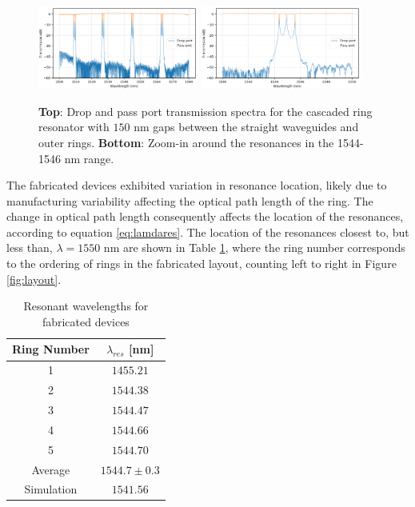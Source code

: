 \documentclass[letterpaper, 10 pt, conference]{ieeeconf}
\begin{document}
\begin{figure}[!ht]
    \centering
    \includegraphics[width = 0.47\textwidth]{casc_full.png}
    \includegraphics[width = 0.47\textwidth]{cascade_zoom.png}
    \caption{\textbf{Top}: Drop and pass port transmission spectra for the cascaded ring resonator with $150$ nm gaps between the straight waveguides and outer rings. \textbf{Bottom}: Zoom-in around the resonances in the 1544-1546 nm range. }
    \label{fig:casc_zoom}
\end{figure} 


The fabricated devices exhibited variation in resonance location, likely due to manufacturing variability affecting the optical path length of the ring. The change in optical path length  consequently affects the location of the resonances, according to equation \eqref{eq:lamdares}. The location of the resonances closest to, but less than, $\lambda = 1550$ nm are shown in Table \ref{tab:lambdares}, where the ring number corresponds to the ordering of rings in the fabricated layout, counting left to right in Figure \ref{fig:layout}.

\begin{table}[!ht]
\centering
\caption{Resonant wavelengths for fabricated devices}
\begin{tabular}{|c|c|}
\hline
\textbf{Ring Number} & \textbf{$\lambda_{res}$ {[}nm{]}} \\ \hline
1 & $1455.21$ \\ \hline
2 & $1544.38$ \\ \hline
3 & $1544.47$ \\ \hline
4 & $1544.66$ \\ \hline
5 & $1544.70$ \\ \hline
Average & $1544.7 \pm 0.3$ \\ \hline
Simulation & $1541.56$ \\ \hline
\end{tabular}
\label{tab:lambdares}
\end{table}
\end{document}
